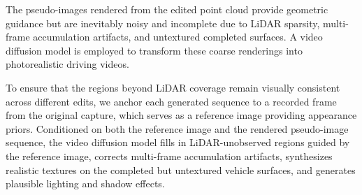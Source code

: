 \documentclass[runningheads]{llncs}
\begin{document}


The pseudo-images rendered from the edited point cloud provide geometric guidance but are inevitably noisy and incomplete due to LiDAR sparsity, 
multi-frame accumulation artifacts, and untextured completed surfaces. A video diffusion model is employed to transform these coarse renderings 
into photorealistic driving videos.

To ensure that the regions beyond LiDAR coverage remain visually consistent across different edits, we anchor each generated sequence to a recorded frame from the original capture, which serves as a reference image providing appearance priors. Conditioned on both the reference image and the rendered pseudo-image sequence, the video diffusion model fills in LiDAR-unobserved regions guided by the reference image, corrects multi-frame accumulation artifacts, synthesizes 
realistic textures on the completed but untextured vehicle surfaces, and generates plausible lighting and shadow effects.
\end{document}

